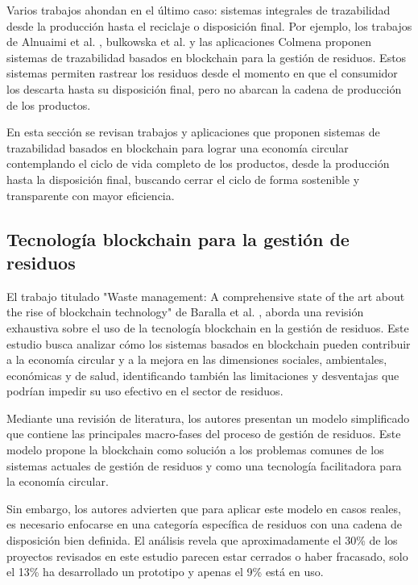 \documentclass[main.tex]{subfiles}
\begin{document}
Varios trabajos ahondan en el último caso: sistemas integrales de trazabilidad desde la producción hasta el reciclaje o disposición final. Por ejemplo, los trabajos de Alnuaimi et al. \cite{alnuaimi2023blockchain}, bulkowska et al. \cite{bulkowska2023implementation} y las aplicaciones Colmena \cite{colmena2024} proponen sistemas de trazabilidad basados en blockchain para la gestión de residuos. Estos sistemas permiten rastrear los residuos desde el momento en que el consumidor los descarta hasta su disposición final, pero no abarcan la cadena de producción de los productos.

En esta sección se revisan trabajos y aplicaciones que proponen sistemas de trazabilidad basados en blockchain para lograr una economía circular contemplando el ciclo de vida completo de los productos, desde la producción hasta la disposición final, buscando cerrar el ciclo de forma sostenible y transparente con mayor eficiencia.

\subsection{Tecnología blockchain para la gestión de residuos}

El trabajo titulado "Waste management: A comprehensive state of the art about the rise of blockchain technology" de Baralla et al. \cite{baralla2023waste}, aborda una revisión exhaustiva sobre el uso de la tecnología blockchain en la gestión de residuos. Este estudio busca analizar cómo los sistemas basados en blockchain pueden contribuir a la economía circular y a la mejora en las dimensiones sociales, ambientales, económicas y de salud, identificando también las limitaciones y desventajas que podrían impedir su uso efectivo en el sector de residuos.

Mediante una revisión de literatura, los autores presentan un modelo simplificado que contiene las principales macro-fases del proceso de gestión de residuos. Este modelo propone la blockchain como solución a los problemas comunes de los sistemas actuales de gestión de residuos y como una tecnología facilitadora para la economía circular. 

Sin embargo, los autores advierten que para aplicar este modelo en casos reales, es necesario enfocarse en una categoría específica de residuos con una cadena de disposición bien definida. El análisis revela que aproximadamente el 30\% de los proyectos revisados en este estudio parecen estar cerrados o haber fracasado, solo el 13\% ha desarrollado un prototipo y apenas el 9\% está en uso.
\end{document}
